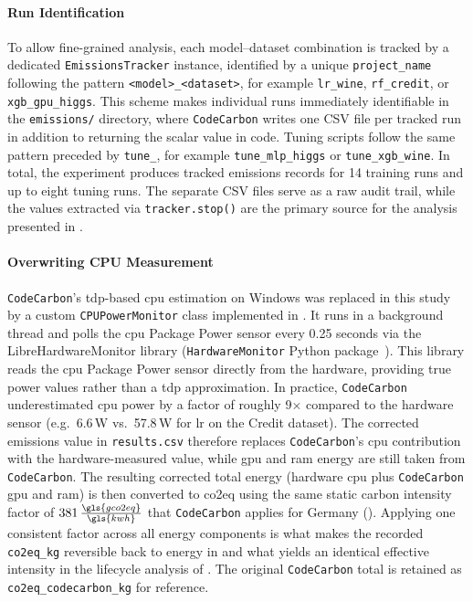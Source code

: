 \paragraph{Run Identification}
To allow fine-grained analysis, each model--dataset combination is tracked by a dedicated \texttt{EmissionsTracker} instance, identified by a unique \texttt{project\_name} following the pattern \texttt{<model>\_<dataset>}, for example \texttt{lr\_wine}, \texttt{rf\_credit}, or \texttt{xgb\_gpu\_higgs}. This scheme makes individual runs immediately identifiable in the \texttt{emissions/} directory, where \texttt{CodeCarbon} writes one CSV file per tracked run in addition to returning the scalar value in code. Tuning scripts follow the same pattern preceded by \texttt{tune\_}, for example \texttt{tune\_mlp\_higgs} or \texttt{tune\_xgb\_wine}. In total, the experiment produces tracked emissions records for 14 training runs and up to eight tuning runs. The separate CSV files serve as a raw audit trail, while the values extracted via \texttt{tracker.stop()} are the primary source for the analysis presented in .

\paragraph{Overwriting CPU Measurement}
\texttt{CodeCarbon}'s \gls{tdp}-based \gls{cpu} estimation on Windows was replaced in this study by a custom \texttt{CPUPowerMonitor} class implemented in . It runs in a background thread and polls the \gls{cpu} Package Power sensor every 0.25 seconds via the LibreHardwareMonitor library (\texttt{HardwareMonitor} Python package~\cite{feixSnip3rnickPyHardwareMonitor2026}). This library reads the \gls{cpu} Package Power sensor directly from the hardware, providing true power values rather than a \gls{tdp} approximation. In practice, \texttt{CodeCarbon} underestimated \gls{cpu} power by a factor of roughly 9$\times$ compared to the hardware sensor (e.g.\ 6.6\,W vs.\ 57.8\,W for \gls{lr} on the Credit dataset). The corrected emissions value in \texttt{results.csv} therefore replaces \texttt{CodeCarbon}'s \gls{cpu} contribution with the hardware-measured value, while \gls{gpu} and \gls{ram} energy are still taken from \texttt{CodeCarbon}. The resulting corrected total energy (hardware \gls{cpu} plus \texttt{CodeCarbon} \gls{gpu} and \gls{ram}) is then converted to \gls{co2eq} using the same static carbon intensity factor of $381\,\frac{\gls{gco2eq}}{\gls{kwh}}$ that \texttt{CodeCarbon} applies for Germany (). Applying one consistent factor across all energy components is what makes the recorded \texttt{co2eq\_kg} reversible back to energy in  and what yields an identical effective intensity in the lifecycle analysis of . The original \texttt{CodeCarbon} total is retained as \texttt{co2eq\_codecarbon\_kg} for reference.

